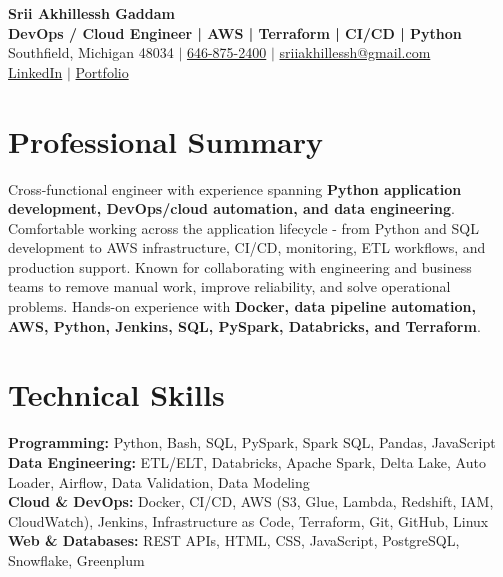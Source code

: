 \documentclass[letterpaper,10pt]{article}
\begin{document}
\fontsize{9.35pt}{10.45pt}\selectfont

\begin{center}
    {\LARGE \textbf{Srii Akhillessh Gaddam}} \\[-1pt]
    \textbf{DevOps / Cloud Engineer | AWS | Terraform | CI/CD | Python} \\[2pt]
    Southfield, Michigan 48034 $|$
    \href{tel:6468752400}{646-875-2400} $|$
    \href{mailto:sriiakhillessh@gmail.com}{sriiakhillessh@gmail.com} \\[1pt]
    \href{https://www.linkedin.com/in/srii-akhiilessh-gaddam-b48668191/}{LinkedIn} $|$
    \href{https://sriiakhillesshg.github.io/portfolio/}{Portfolio}
\end{center}
\vspace{-8pt}

\section{Professional Summary}
\small{Cross-functional engineer with experience spanning \textbf{Python application development, DevOps/cloud automation, and data engineering}. Comfortable working across the application lifecycle - from Python and SQL development to AWS infrastructure, CI/CD, monitoring, ETL workflows, and production support. Known for collaborating with engineering and business teams to remove manual work, improve reliability, and solve operational problems. Hands-on experience with \textbf{Docker, data pipeline automation, AWS, Python, Jenkins, SQL, PySpark, Databricks, and Terraform}.}

\section{Technical Skills}
\small{
\textbf{Programming:} Python, Bash, SQL, PySpark, Spark SQL, Pandas, JavaScript \\
\textbf{Data Engineering:} ETL/ELT, Databricks, Apache Spark, Delta Lake, Auto Loader, Airflow, Data Validation, Data Modeling \\
\textbf{Cloud \& DevOps:} Docker, CI/CD, AWS (S3, Glue, Lambda, Redshift, IAM, CloudWatch), Jenkins, Infrastructure as Code, Terraform, Git, GitHub, Linux \\
\textbf{Web \& Databases:} REST APIs, HTML, CSS, JavaScript, PostgreSQL, Snowflake, Greenplum
}
\end{document}

